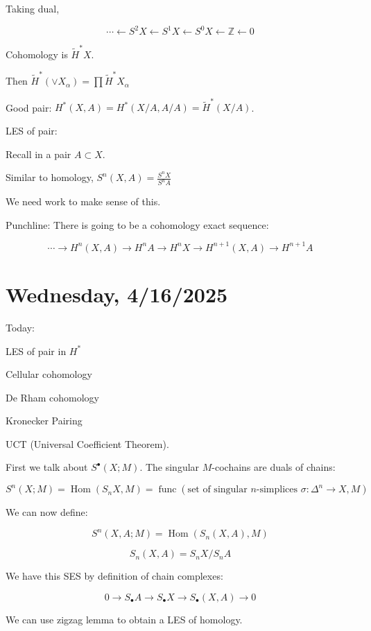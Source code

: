 \documentclass{article}
\theoremstyle{definition}
\begin{document}
    Taking dual,

    \[
        \cdots \leftarrow S^2 X \leftarrow S^1 X \leftarrow S^0 X \leftarrow \mathbb{Z} \leftarrow 0
    \]

    Cohomology is \(\widetilde{H}^{\ast} X\).

    Then \(\widetilde{H}^{\ast} (\vee X_\alpha ) = \prod \widetilde{H}^{\ast} X_\alpha\) 

    Good pair: \(H^{\ast} (X,A) = H^{\ast} (X / A, A / A) = \widetilde{H}^{\ast} (X / A)\).
    
    LES of pair:

    Recall in a pair \(A \subset X\).

    Similar to homology, \(S^n (X,A) = \frac{S^n X}{S^n A}\)
    
    We need work to make sense of this.

    Punchline: There is going to be a cohomology exact sequence:

    \[
        \cdots \to H^n(X,A) \to H^n A \to H^n X \to H^{n+1} (X,A) \to H^{n+1} A
    \]

    \section*{Wednesday, 4/16/2025}
    
    Today:

    LES of pair in \(H^{\ast}\)

    Cellular cohomology

    De Rham cohomology

    Kronecker Pairing

    UCT (Universal Coefficient Theorem).

    First we talk about \(S^\bullet(X;M)\). The singular \(M\)-cochains are duals of chains:

    \[
        S^n(X;M) = \operatorname{Hom}(S_n X, M) = \operatorname{func}(\text{set of singular \(n\)-simplices } \sigma: \Delta^n \to X, M)
    \]

    We can now define:

    \[
        S^n(X,A;M) = \operatorname{Hom}(S_n(X,A), M)
    \]

    \[
        S_n(X,A) = S_n X / S_n A
    \]

    We have this SES by definition of chain complexes:

    \[
        0 \to S_\bullet A \to S_\bullet X \to S_\bullet(X,A) \to 0
    \]

    We can use zigzag lemma to obtain a LES of homology.
\end{document}
